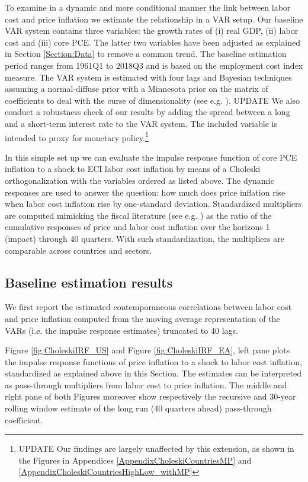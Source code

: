 \documentclass[11pt]{article}
\begin{document}
To examine in a dynamic and more conditional manner the link between labor cost and price inflation we estimate the relationship in a VAR setup. Our baseline VAR system contains three variables: the growth rates of (i) real GDP, (ii) labor cost and (iii) core PCE. The latter two variables have been adjusted as explained in Section \ref{Section:Data} to remove a common trend. The baseline estimation period ranges from 1961Q1 to 2018Q3 and is based on the employment cost index measure. The VAR system is estimated with four lags and Bayesian techniques assuming a normal-diffuse prior with a Minnesota prior on the matrix of coefficients to deal with the curse of dimensionality (see e.g. \cite{KadyialaKarlsson98}). UPDATE We also conduct a robustness check of our results by adding the spread between a long and a short-term interest rate to the VAR system. The included variable is intended to proxy for monetary policy.\footnote{UPDATE Our findings are largely unaffected by this extension, as shown in the Figures in Appendices \ref{AppendixCholeskiCountriesMP} and \ref{AppendixCholeskiCountriesHighLow_withMP}}

In this simple set up we can evaluate the impulse response function of core PCE inflation to a shock to ECI labor cost inflation by means of a Choleski orthogonalization with the variables ordered as listed above. The dynamic responses are used to answer the question: how much does price inflation rise when labor cost inflation rise by one-standard deviation. Standardized multipliers are computed mimicking the fiscal literature (see e.g. \cite{MountfordUhlig09}) as the ratio of the cumulative responses of price and labor cost inflation over the horizons 1 (impact) through 40 quarters. With such standardization, the multipliers are comparable across countries and sectors.

\subsection{Baseline estimation results}

We first report the estimated contemporaneous correlations between labor cost and price inflation computed from the moving average representation of the VARs (i.e. the impulse response estimates) truncated to 40 lags. 

Figure \ref{fig:CholeskiIRF_US} and Figure \ref{fig:CholeskiIRF_EA}, left pane plots the impulse response functions of price inflation to a shock to labor cost inflation, standardized as explained above in this Section. The estimates can be interpreted as pass-through multipliers from labor cost to price inflation. The middle and right pane of both Figures moreover show respectively the recursive and 30-year rolling window estimate of the long run (40 quarters ahead) pass-through coefficient.
\end{document}
